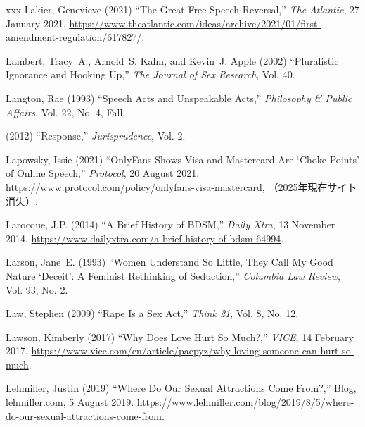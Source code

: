 \documentclass[]{jlreq} \usepackage{mystyle}
\begin{document}
\begin{thebibliography}{xxx}
Lakier, Genevieve (2021) ``The Great Free-Speech Reversal,'' \emph{The
  Atlantic}, 27 January 2021.
  \url{https://www.theatlantic.com/ideas/archive/2021/01/first-amendment-regulation/617827/}.

Lambert, Tracy~A., Arnold~S. Kahn, and Kevin~J. Apple (2002) ``Pluralistic
  Ignorance and Hooking Up,'' \textit{ The Journal of Sex Research}, Vol. 40.

Langton, Rae (1993) ``Speech Acts and Unspeakable Acts,'' \textit{ Philosophy
  \& Public Affairs}, Vol. 22, No. 4, Fall.

 \bysame{}  (2012) ``Response,'' \textit{ Jurisprudence}, Vol. 2.

Lapowsky, Issie (2021) ``OnlyFans Shows Visa and Mastercard Are `Choke-Points'
  of Online Speech,'' \emph{Protocol}, 20 August 2021.
  \url{https://www.protocol.com/policy/onlyfans-visa-mastercard},
  （2025年現在サイト消失）.

Larocque, J.P. (2014) ``A Brief History of BDSM,'' \emph{Daily Xtra}, 13
  November 2014. \url{https://www.dailyxtra.com/a-brief-history-of-bdsm-64994}.

Larson, Jane~E. (1993) ``Women Understand So Little, They Call My Good Nature
  ‘Deceit': A Feminist Rethinking of Seduction,'' \textit{ Columbia Law
  Review}, Vol. 93, No. 2.

Law, Stephen (2009) ``Rape Is a Sex Act,'' \textit{ Think 21}, Vol. 8, No. 12.

Lawson, Kimberly (2017) ``Why Does Love Hurt So Much?,'' \emph{VICE}, 14
  February 2017.
  \url{https://www.vice.com/en/article/paepyz/why-loving-someone-can-hurt-so-much}.

Lehmiller, Justin (2019) ``Where Do Our Sexual Attractions Come From?,'' Blog,
  lehmiller.com, 5 August 2019.
  \url{https://www.lehmiller.com/blog/2019/8/5/where-do-our-sexual-attractions-come-from}.


\end{thebibliography}
\end{document}
